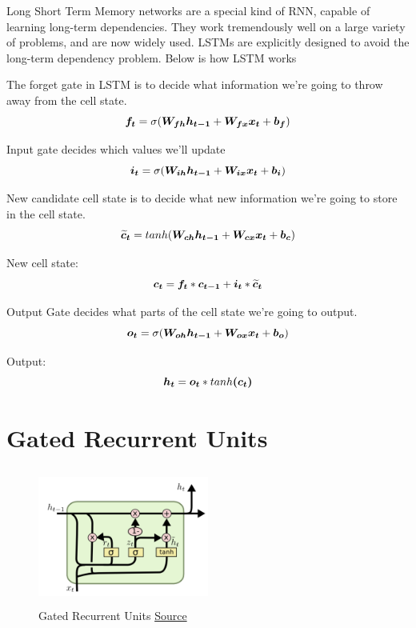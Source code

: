 Long Short Term Memory networks \cite{article-lstm} are a special kind of RNN, capable of learning long-term dependencies. 
They work tremendously well on a large variety of problems, and are now widely used.
LSTMs are explicitly designed to avoid the long-term dependency problem. 
Below is how LSTM works

The forget gate in LSTM is to decide what information we’re going to throw away from the cell state.
\[\vect{f_t} = \sigma(\matr{W_{fh}}\vect{h_{t-1}}+\matr{W_{fx}}\vect{x_t} + \vect{b_f}) \]

Input gate decides which values we’ll update
\[\vect{i_t} = \sigma(\matr{W_{ih}}\vect{h_{t-1}} + \matr{W_{ix}}\vect{x_t} + \vect{b_i})\]

New candidate cell state is to decide what new information we’re going to store in the cell state.
\[\vect{\widetilde{c}_t} = tanh(\matr{W_{ch}}\vect{h_{t-1}} + \matr{W_{cx}}\vect{x_t} + \vect{b_c})\]

New cell state:
\[\vect{c_t} = \vect{f_t}*\vect{c_{t-1}} + \vect{i_t}*\vect{\widetilde{c}_t}\]

Output Gate decides what parts of the cell state we’re going to output.
\[\vect{o_t} = \sigma(\matr{W_{oh}}\vect{h_{t-1}} + \matr{W_{ox}}\vect{x_t} + \vect{b_o})\]

Output:
\[\vect{h_t} = \vect{o_t}*tanh\vect{(c_t)}\]

\section{Gated Recurrent Units}

\begin{figure}[h]
  \centering
      \includegraphics[width=0.5\textwidth,height=4.5cm]{lectures/06-b/image/GRU.png}
          \caption{
            Gated Recurrent Units
            \href{http://colah.github.io/posts/2015-08-Understanding-LSTMs/}{Source}
          }
          \label{fig:gru}
\end{figure}

